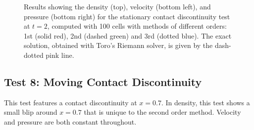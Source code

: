 \documentclass[10pt]{article}
\begin{document}
\begin{figure}[h]
\begin{center}
\begin{tabular}{cc}
	\end{tabular}
  \end{center}
  \caption{Results showing the density (top), velocity (bottom left), and pressure (bottom right) for the stationary contact discontinuity test at $t=2$, computed with 100 cells with methods of different orders: 1st (solid red), 2nd (dashed green) and 3rd (dotted blue). The exact solution, obtained with Toro's Riemann solver, is given by the dash-dotted pink line.}
  \label{fig:den_T7}
\end{figure}


\clearpage

\subsection{Test 8: Moving Contact Discontinuity}
This test features a contact discontinuity at $x=0.7$. In density, this test shows a small blip around $x=0.7$ that is unique to the second order method. Velocity and pressure are both constant throughout. 
\end{document}
